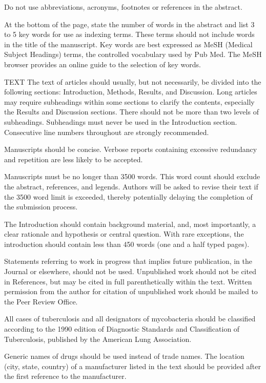 Do not use abbreviations, acronyms, footnotes or references in the abstract.

At the bottom of the page, state the number of words in the abstract and list 3 to 5 key words for use as indexing terms. These terms should not include words in the title of the manuscript. Key words are best expressed as MeSH (Medical Subject Headings) terms, the controlled vocabulary used by Pub Med. The MeSH browser provides an online guide to the selection of key words.

TEXT
The text of articles should usually, but not necessarily, be divided into the following sections: Introduction, Methods, Results, and Discussion. Long articles may require subheadings within some sections to clarify the contents, especially the Results and Discussion sections. There should not be more than two levels of subheadings. Subheadings must never be used in the Introduction section. Consecutive line numbers throughout are strongly recommended.

Manuscripts should be concise. Verbose reports containing excessive redundancy and repetition are less likely to be accepted.

Manuscripts must be no longer than 3500 words. This word count should exclude the abstract, references, and legends. Authors will be asked to revise their text if the 3500 word limit is exceeded, thereby potentially delaying the completion of the submission process.

The Introduction should contain background material, and, most importantly, a clear rationale and hypothesis or central question. With rare exceptions, the introduction should contain less than 450 words (one and a half typed pages).

Statements referring to work in progress that implies future publication, in the Journal or elsewhere, should not be used. Unpublished work should not be cited in References, but may be cited in full parenthetically within the text. Written permission from the author for citation of unpublished work should be mailed to the Peer Review Office.

All cases of tuberculosis and all designators of mycobacteria should be classified according to the 1990 edition of Diagnostic Standards and Classification of Tuberculosis, published by the American Lung Association.

Generic names of drugs should be used instead of trade names. The location (city, state, country) of a manufacturer listed in the text should be provided after the first reference to the manufacturer.

